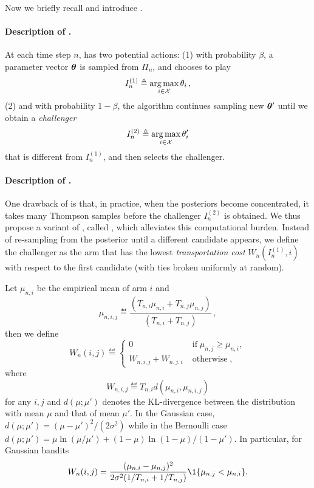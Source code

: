 Now we briefly recall \TTTS and introduce \TCC.

\paragraph{Description of \TTTS.} 
At each time step $n$, \TTTS has two potential actions: (1) with probability $\beta$, a parameter vector ${\boldsymbol \theta}$ is sampled from $\Pi_{n}$, and \TTTS chooses to play 
\[
    I_n^{(1)} \triangleq \operatorname*{arg\,max}_{i\in\mathcal{X}} \theta_i\,,
\] 
(2) and with probability $1-\beta$, the algorithm continues sampling new ${\boldsymbol \theta}'$ until we obtain a \emph{challenger} 
\[
I_n^{(2)} \triangleq \operatorname*{arg\,max}_{i\in\mathcal{X}} \theta_i'
\]
that is different from $I_n^{(1)}$, and \TTTS then selects the challenger.

\paragraph{Description of \TCC.} 
One drawback of \TTTS is that, in practice, when the posteriors become concentrated, it takes many Thompson samples before the challenger $I_n^{(2)}$ is obtained. We thus propose a variant of \TTTS, called \TCC, which alleviates this computational burden. Instead of re-sampling from the posterior until a different candidate appears, we define the challenger as the arm that has the lowest \emph{transportation cost} $W_n(I_n^{(1)},i)$ with respect to the first candidate (with ties broken uniformly at random). 

Let $\mu_{n,i}$ be the empirical mean of arm $i$ and 
\[
    \mu_{n,i,j} \eqdef \dfrac{(T_{n,i}\mu_{n,i} +T_{n,j}\mu_{n,j})}{(T_{n,i}+T_{n,j})}\,,
\]
then we define
\begin{equation}\label{def:Transportation}
	W_n(i,j) \eqdef
	\left\{ \begin{array}{ll}
				0 & \operatorname{if} \mu_{n,j} \geq \mu_{n,i},\\
				W_{n,i,j}+W_{n,j,i} & \operatorname{otherwise},
			\end{array}\right.
\end{equation}
where 
\[
    W_{n,i,j}\eqdef T_{n,i} d\left(\mu_{n,i},\mu_{n,i,j}\right)
\]
for any $i,j$ and $d(\mu ; \mu' )$ denotes the KL-divergence between the distribution with mean $\mu$ and that of mean $\mu'$. In the Gaussian case, $d(\mu;\mu') = (\mu-\mu')^2/(2\sigma^2)$ while in the Bernoulli case $d(\mu;\mu') = \mu \ln (\mu/\mu') + (1-\mu)\ln (1-\mu)/(1-\mu')$.
In particular, for Gaussian bandits 
\[
    W_n(i,j) = \dfrac{(\mu_{n,i}-\mu_{n,j})^2}{2\sigma^2(1/T_{n,i}+1/T_{n,j})}\1\{\mu_{n,j}<\mu_{n,i}\}.
\]


